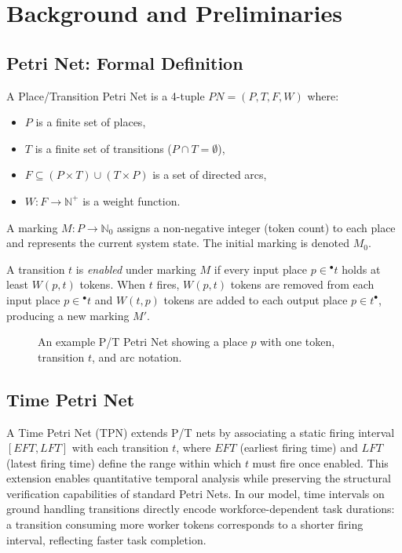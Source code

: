 \documentclass[conference]{IEEEtran}
\begin{document}
\section{Background and Preliminaries}

\subsection{Petri Net: Formal Definition}

A Place/Transition Petri Net is a 4-tuple $PN = (P, T, F, W)$ where:
\begin{itemize}
  \item $P$ is a finite set of places,
  \item $T$ is a finite set of transitions ($P \cap T = \emptyset$),
  \item $F \subseteq (P \times T) \cup (T \times P)$ is a set of directed arcs,
  \item $W: F \rightarrow \mathbb{N}^{+}$ is a weight function.
\end{itemize}

A marking $M: P \rightarrow \mathbb{N}_{0}$ assigns a non-negative integer (token
count) to each place and represents the current system state. The initial marking
is denoted $M_0$.

A transition $t$ is \textit{enabled} under marking $M$ if every input place
$p \in {}^{\bullet}t$ holds at least $W(p,t)$ tokens. When $t$ fires, $W(p,t)$
tokens are removed from each input place $p \in {}^{\bullet}t$ and $W(t,p)$
tokens are added to each output place $p \in t^{\bullet}$, producing a new
marking $M'$.

\begin{figure}[htbp]
  \centering
  \caption{An example P/T Petri Net showing a place $p$ with one token,
           transition $t$, and arc notation.}
  \label{fig:pn_example}
\end{figure}

\subsection{Time Petri Net}

A Time Petri Net (TPN) extends P/T nets by associating a static firing interval
$[\mathit{EFT}, \mathit{LFT}]$ with each transition $t$, where $\mathit{EFT}$
(earliest firing time) and $\mathit{LFT}$ (latest firing time) define the range
within which $t$ must fire once enabled. This extension enables quantitative
temporal analysis while preserving the structural verification capabilities of
standard Petri Nets. In our model, time intervals on ground handling transitions
directly encode workforce-dependent task durations: a transition consuming more
worker tokens corresponds to a shorter firing interval, reflecting faster task
completion.
\end{document}
